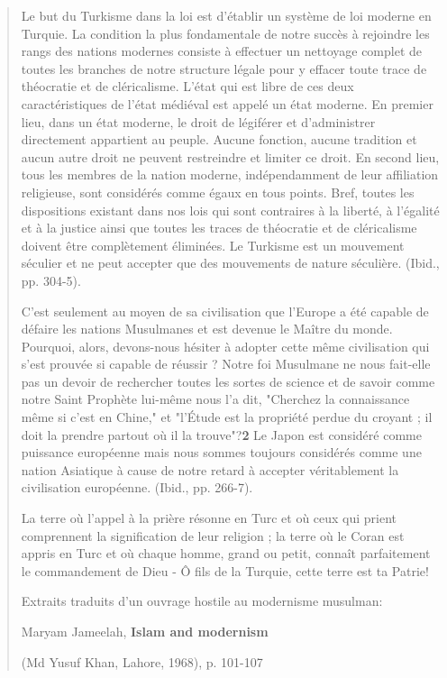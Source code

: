 \begin{quote}
Le but du Turkisme dans la loi est d'établir un système de loi moderne
en Turquie. La condition la plus fondamentale de notre succès à
rejoindre les rangs des nations modernes consiste à effectuer un
nettoyage complet de toutes les branches de notre structure légale pour
y effacer toute trace de théocratie et de cléricalisme. L'état qui est
libre de ces deux caractéristiques de l'état médiéval est appelé un état
moderne. En premier lieu, dans un état moderne, le droit de légiférer et
d'administrer directement appartient au peuple. Aucune fonction, aucune
tradition et aucun autre droit ne peuvent restreindre et limiter ce
droit. En second lieu, tous les membres de la nation moderne,
indépendamment de leur affiliation religieuse, sont considérés comme
égaux en tous points. Bref, toutes les dispositions existant dans nos
lois qui sont contraires à la liberté, à l'égalité et à la justice ainsi
que toutes les traces de théocratie et de cléricalisme doivent être
complètement éliminées. Le Turkisme est un mouvement séculier et ne peut
accepter que des mouvements de nature séculière. (Ibid., pp. 304-5).

C'est seulement au moyen de sa civilisation que l'Europe a été capable
de défaire les nations Musulmanes et est devenue le Maître du monde.
Pourquoi, alors, devons-nous hésiter à adopter cette même civilisation
qui s'est prouvée si capable de réussir ? Notre foi Musulmane ne nous
fait-elle pas un devoir de rechercher toutes les sortes de science et de
savoir comme notre Saint Prophète lui-même nous l'a dit, "Cherchez la
connaissance même si c'est en Chine," et "l'Étude est la propriété
perdue du croyant ; il doit la prendre partout où il la
trouve"?\textbf{2} Le Japon est considéré comme puissance européenne
mais nous sommes toujours considérés comme une nation Asiatique à cause
de notre retard à accepter véritablement la civilisation européenne.
(Ibid., pp. 266-7).

La terre où l'appel à la prière résonne en Turc et où ceux qui prient
comprennent la signification de leur religion ; la terre où le Coran est
appris en Turc et où chaque homme, grand ou petit, connaît parfaitement
le commandement de Dieu - Ô fils de la Turquie, cette terre est ta
Patrie!

Extraits traduits d'un ouvrage hostile au modernisme musulman:

Maryam Jameelah, \textbf{Islam and modernism}

(Md Yusuf Khan, Lahore, 1968), p. 101-107
\end{quote}

